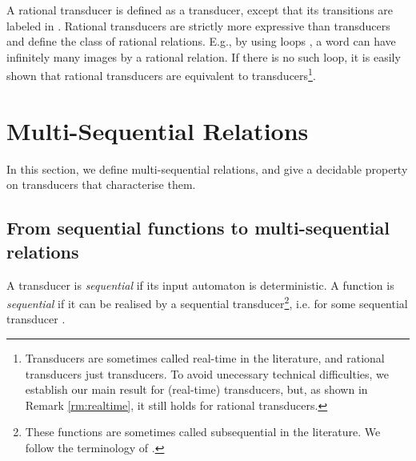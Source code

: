 \documentclass[envcountsame]{llncs}
\begin{document}
A rational transducer is defined as a transducer, except that its
transitions are labeled in . Rational
transducers are strictly more expressive than transducers and define
the class of rational relations. E.g., by using loops 
, a word can have infinitely many images
by a rational relation. If there is no such loop, it is
easily shown that rational transducers are equivalent to transducers\footnote{Transducers are sometimes called real-time in the
  literature, and rational transducers just transducers. To avoid
  unecessary technical difficulties, we establish our main result for 
  (real-time) transducers, but, as shown in Remark \ref{rm:realtime},
  it still holds for rational transducers.}. 




\vspace{-3mm}
\section{Multi-Sequential Relations}
\vspace{-2mm}

In this section, we define multi-sequential relations, and give a
decidable property on transducers that characterise them.

\vspace{-4mm}
\subsection{From sequential functions to multi-sequential relations}
\vspace{-2mm}

A transducer  is
\emph{sequential} if its input automaton is deterministic. A function  is
\emph{sequential} if it can be realised by a sequential
transducer\footnote{These functions are sometimes called subsequential
in the literature. We follow the terminology of
\cite{DBLP:books/daglib/0023547}.}, i.e.  for
some sequential transducer . 
\end{document}
